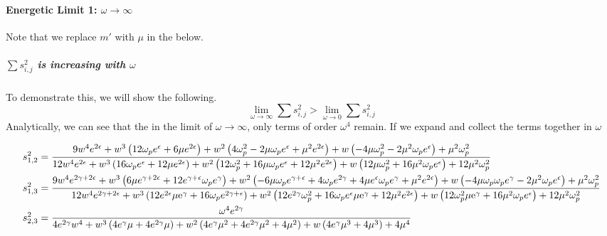 \paragraph{Energetic Limit 1: $\omega\to\infty$}

Note that we replace $m'$ with $\mu$ in the below.

\subparagraph{$\sum{s^2_{i,j}}$ is increasing with $\omega$} To demonstrate this, we will show the following.  
\[
\lim_{\omega\to\infty}\sum{s^2_{i,j}}>\lim_{\omega\to0}\sum{s^2_{i,j}}
\]
Analytically, we can see that the in the limit of $\omega\to\infty$, only terms of order $\omega^4$ remain.  If we expand and collect the terms together in $\omega$
\begin{widetext}
\begin{eqnarray*}
s^2_{1,2}&=\frac{9 w^4 e^{2 \epsilon }+w^3 \left(12 \omega_p e^{\epsilon }+6 \mu  e^{2 \epsilon }\right)+w^2 \left(4 \omega_p^2-2 \mu  \omega_p e^{\epsilon }+\mu ^2 e^{2 \epsilon }\right)+w \left(-4 \mu  \omega_p^2-2 \mu ^2 \omega_p e^{\epsilon }\right)+\mu ^2 \omega_p^2}{12 w^4 e^{2 \epsilon }+w^3 \left(16 \omega_p e^{\epsilon }+12 \mu  e^{2 \epsilon }\right)+w^2 \left(12 \omega_p^2+16 \mu  \omega_p e^{\epsilon }+12 \mu ^2 e^{2 \epsilon }\right)+w \left(12 \mu  \omega_p^2+16 \mu ^2 \omega_p e^{\epsilon }\right)+12 \mu ^2 \omega_p^2}\\
s^2_{1,3}&=\frac{9 w^4 e^{2 \gamma +2 \epsilon }+w^3 \left(6 \mu  e^{\gamma +2 \epsilon }+12 e^{\gamma +\epsilon }\omega_p e^{\gamma }\right)+w^2 \left(-6 \mu  \omega_p e^{\gamma +\epsilon }+4\omega_p e^{2 \gamma }+4 \mu  e^{\epsilon }\omega_p e^{\gamma }+\mu ^2 e^{2 \epsilon }\right)+w \left(-4 \mu  \omega_p\omega_p e^{\gamma }-2 \mu ^2 \omega_p e^{\epsilon }\right)+\mu ^2 \omega_p^2}{12 w^4 e^{2 \gamma +2 \epsilon }+w^3 \left(12 e^{2 \epsilon } \text{$\mu $e}^{\gamma }+16 \omega_p e^{2 \gamma +\epsilon }\right)+w^2 \left(12 e^{2 \gamma } \omega_p^2+16 \omega_p e^{\epsilon } \text{$\mu $e}^{\gamma }+12 \mu ^2 e^{2 \epsilon }\right)+w \left(12 \omega_p^2 \text{$\mu $e}^{\gamma }+16 \mu ^2 \omega_p e^{\epsilon }\right)+12 \mu ^2 \omega_p^2}\\
s^2_{2,3}&=\frac{\omega^4 e^{2\gamma}}{4 e^{2 \gamma } w^4+w^3 \left(4 e^{\gamma } \mu +4 e^{2 \gamma } \mu \right)+w^2 \left(4 e^{\gamma } \mu ^2+4 e^{2 \gamma } \mu ^2+4 \mu ^2\right)+w \left(4 e^{\gamma } \mu ^3+4 \mu ^3\right)+4 \mu ^4}
\end{eqnarray*}
\end{widetext}
